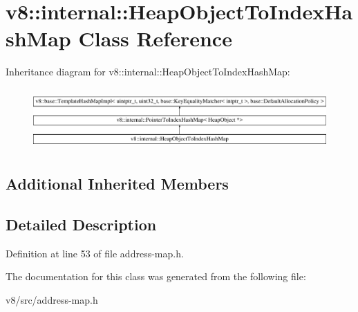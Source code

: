 \hypertarget{classv8_1_1internal_1_1HeapObjectToIndexHashMap}{}\section{v8\+:\+:internal\+:\+:Heap\+Object\+To\+Index\+Hash\+Map Class Reference}
\label{classv8_1_1internal_1_1HeapObjectToIndexHashMap}
Inheritance diagram for v8\+:\+:internal\+:\+:Heap\+Object\+To\+Index\+Hash\+Map\+:\begin{figure}[H]
\begin{center}
\leavevmode
\includegraphics[height=2.362869cm]{classv8_1_1internal_1_1HeapObjectToIndexHashMap}
\end{center}
\end{figure}
\subsection*{Additional Inherited Members}


\subsection{Detailed Description}


Definition at line 53 of file address-\/map.\+h.



The documentation for this class was generated from the following file\+:\begin{DoxyCompactItemize}
\item 
v8/src/address-\/map.\+h\end{DoxyCompactItemize}

